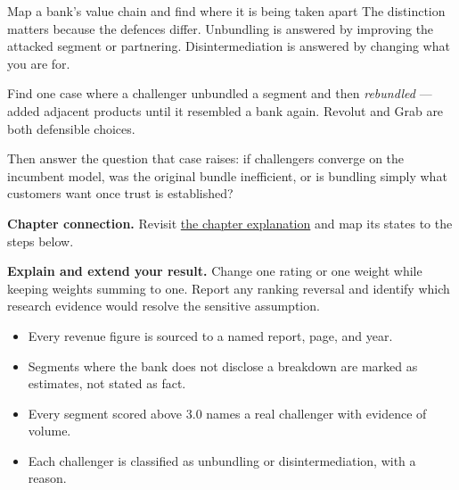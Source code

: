 \begin{labproject}{Map a bank's value chain and find where it is being taken apart}
The distinction matters because the defences differ. Unbundling is answered by improving the attacked segment or partnering. Disintermediation is answered by changing what you are for.

\begin{tryit}
Find one case where a challenger unbundled a segment and then \emph{rebundled} --- added adjacent products until it resembled a bank again. Revolut and Grab are both defensible choices.

Then answer the question that case raises: if challengers converge on the incumbent model, was the original bundle inefficient, or is bundling simply what customers want once trust is established?
\end{tryit}
\end{labproject}

\textbf{Chapter connection.} Revisit \hyperref[ch:intro-fintech]{the chapter explanation} and map its states to the steps below.


\begin{verification}
\textbf{Explain and extend your result.} Change one rating or one weight while keeping weights summing to one. Report any ranking reversal and identify which research evidence would resolve the sensitive assumption.


\begin{itemize}
  \item Every revenue figure is sourced to a named report, page, and year.
  \item Segments where the bank does not disclose a breakdown are marked as estimates, not stated as fact.
  \item Every segment scored above 3.0 names a real challenger with evidence of volume.
  \item Each challenger is classified as unbundling or disintermediation, with a reason.
\end{itemize}
\end{verification}
